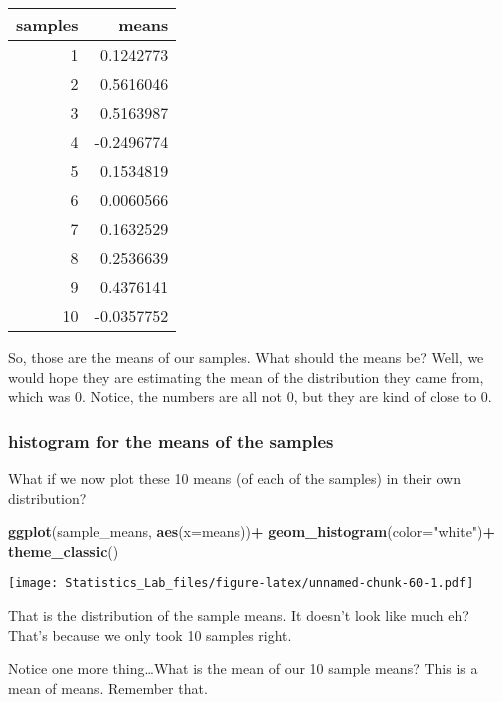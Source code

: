 \documentclass[
]{book}
\newenvironment{Shaded}{\begin{snugshade}}{\end{snugshade}}
\newcommand{\AttributeTok}[1]{\textcolor[rgb]{0.13,0.29,0.53}{#1}}
\newcommand{\FunctionTok}[1]{\textcolor[rgb]{0.13,0.29,0.53}{\textbf{#1}}}
\newcommand{\NormalTok}[1]{#1}
\newcommand{\SpecialCharTok}[1]{\textcolor[rgb]{0.81,0.36,0.00}{\textbf{#1}}}
\newcommand{\StringTok}[1]{\textcolor[rgb]{0.31,0.60,0.02}{#1}}
\begin{document}
\begin{tabular}{r|r}
\hline
samples & means\\
\hline
1 & 0.1242773\\
\hline
2 & 0.5616046\\
\hline
3 & 0.5163987\\
\hline
4 & -0.2496774\\
\hline
5 & 0.1534819\\
\hline
6 & 0.0060566\\
\hline
7 & 0.1632529\\
\hline
8 & 0.2536639\\
\hline
9 & 0.4376141\\
\hline
10 & -0.0357752\\
\hline
\end{tabular}

So, those are the means of our samples. What should the means be? Well,
we would hope they are estimating the mean of the distribution they came
from, which was 0. Notice, the numbers are all not 0, but they are kind
of close to 0.

\hypertarget{histogram-for-the-means-of-the-samples}{%
\subsubsection{histogram for the means of the samples}\label{histogram-for-the-means-of-the-samples}}

What if we now plot these 10 means (of each of the samples) in their own
distribution?

\begin{Shaded}
\begin{Highlighting}[]
 \FunctionTok{ggplot}\NormalTok{(sample\_means, }\FunctionTok{aes}\NormalTok{(}\AttributeTok{x=}\NormalTok{means))}\SpecialCharTok{+}
  \FunctionTok{geom\_histogram}\NormalTok{(}\AttributeTok{color=}\StringTok{"white"}\NormalTok{)}\SpecialCharTok{+}
  \FunctionTok{theme\_classic}\NormalTok{()}
\end{Highlighting}
\end{Shaded}

\texttt{[image: Statistics\_Lab\_files/figure-latex/unnamed-chunk-60-1.pdf]}

That is the distribution of the sample means. It doesn't look like much
eh? That's because we only took 10 samples right.

Notice one more thing\ldots What is the mean of our 10 sample means? This is
a mean of means. Remember that.
\end{document}
